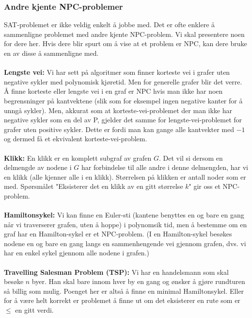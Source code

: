 \subsubsection{Andre kjente NPC-problemer}
SAT-problemet er ikke veldig enkelt å jobbe med. Det er ofte enklere å sammenligne problemet med andre kjente NPC-problem. Vi skal presentere noen for dere her. Hvis dere blir spurt om å vise at et problem er NPC, kan dere bruke en av disse å sammenligne med.
\\\\
\textbf{Lengste vei:} Vi har sett på algoritmer som finner korteste vei i grafer uten negative sykler med polynomisk kjøretid. Men for generelle grafer blir det verre. Å finne korteste eller lengste vei i en graf er NPC hvis man ikke har noen begrensninger på kantvektene (slik som for eksempel ingen negative kanter for å unngå sykler). Men, akkurat som at korteste-vei-problemet der man ikke har negative sykler som en del av P, gjelder det samme for lengste-vei-problemet for grafer uten positive sykler. Dette er fordi man kan gange alle kantvekter med $-1$ og dermed få et ekvivalent korteste-vei-problem.
\\\\
\textbf{Klikk:} En klikk er en komplett subgraf av grafen $G$. Det vil si dersom en delmengde av nodene i $G$ har forbindelse til alle andre i denne delmengden, har vi en klikk (alle kjenner alle i en klikk). Størrelsen på klikken er antall noder som er med. Spørsmålet "Eksisterer det en klikk av en gitt størrelse $k$" gir oss et NPC-problem.
\\\\
\textbf{Hamiltonsykel:} Vi kan finne en Euler-sti (kantene benyttes en og bare en gang når vi traverserer grafen, uten å hoppe) i polynomsik tid, men å bestemme om en graf har en Hamilton-sykel er et NPC-problem. (I en Hamilton-sykel besøkes nodene en og bare en gang langs en sammenhengende vei gjennom grafen, dvs. vi har en enkel sykel gjennom alle nodene i grafen.)
\\\\
\textbf{Travelling Salesman Problem (TSP):} Vi har en handelsmann som skal besøke $n$ byer. Han skal bare innom hver by en gang og ønsker å gjøre rundturen så billig som mulig. Poenget her er altså å finne en minimal Hamiltonsykel. Eller for å være helt korrekt er problemet å finne ut om det eksisterer en rute som er $\leq$ en gitt verdi.

